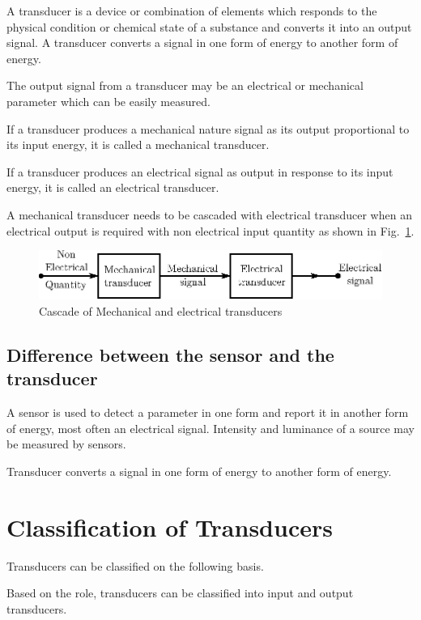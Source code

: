 A transducer is a device or combination of elements which responds to the physical condition or chemical state of a substance and converts it into an output signal. A transducer converts a signal in one form of energy to another form of energy. 

The output signal from a transducer may be an electrical or mechanical parameter which can be easily measured.

If a transducer produces a mechanical nature signal as its output proportional to its input energy, it is called a mechanical transducer.

If a transducer produces an electrical signal as output in response to its input energy, it is called an electrical transducer.

A mechanical transducer needs to be cascaded with electrical transducer when an electrical output is required with non electrical input quantity as shown in Fig.~\ref{fig8.1}.
\begin{figure}[H]
\centering
\includegraphics{chap8/fig8.1.eps}
\caption{Cascade of Mechanical and electrical transducers}\label{fig8.1}
\end{figure}

\subsection{Difference between the sensor and the transducer}\label{sec8.2.1}

A sensor is used to detect a parameter in one form and report it in another form of energy, most often an electrical signal. Intensity and luminance of a source may be measured by sensors. 

Transducer converts a signal in one form of energy to another form of energy.

\section{Classification of Transducers}\label{sec8.3}

Transducers can be classified on the following basis.

\smallskip
{}

Based on the role, transducers can be classified into input and output transducers.

